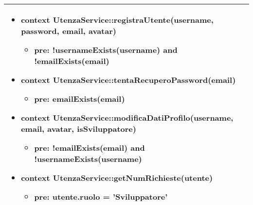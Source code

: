 \begin{tabular}{|| l | p{34em} ||}
\begin{itemize}[leftmargin=*]
	\item \textbf{context} UtenzaService::registraUtente(username, password, email, avatar)
	\begin{itemize}
		\item[ ] \textbf{pre:} !usernameExists(username) and !emailExists(email)
	\end{itemize}

	\item \textbf{context} UtenzaService::tentaRecuperoPassword(email)
	\begin{itemize}
		\item[ ] \textbf{pre:} emailExists(email)	
	\end{itemize}

	\item \textbf{context} UtenzaService::modificaDatiProfilo(username, email, avatar, isSviluppatore)
	\begin{itemize}
		\item[ ] \textbf{pre:} !emailExists(email) and !usernameExists(username)	
	\end{itemize}

	\item \textbf{context} UtenzaService::getNumRichieste(utente)
	\begin{itemize}
		\item[ ] \textbf{pre:} utente.ruolo = 'Sviluppatore'	
	\end{itemize}

\end{itemize}\\
\hline
\end{tabular}

\newpage
